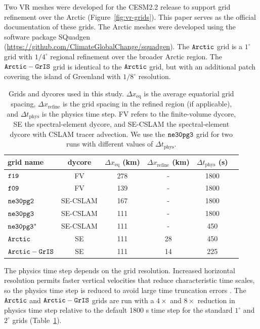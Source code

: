\documentclass[draft]{agujournal2019}
\begin{document}
Two VR meshes were developed for the CESM2.2 release to support grid refinement over the Arctic (Figure~\ref{fig:vr-grids}). This paper serves as the official documentation of these grids. The Arctic meshes were developed using the software package SQuadgen (\url{https://github.com/ClimateGlobalChange/squadgen}). The $\tt Arctic$ grid is a $1^{\circ}$ grid with $1/4^{\circ}$ regional refinement over the broader Arctic region. The $\tt Arctic-GrIS$ grid is identical to the $\tt Arctic$ grid, but with an additional patch covering the island of Greenland with $1/8^{\circ}$ resolution.

 \begin{table}
 \centering
 \scriptsize
 \begin{tabular}{lccccc}
   \hline
   grid name & dycore & $\Delta x_{\mathrm{eq}}$ (km) & $\Delta x_{\mathrm{refine}}$ (km) & $\Delta t_{\mathrm{phys}}$ (s) \\ 
   \hline
   $\tt f19$ & FV & 278 & - &1800 \\
   $\tt f09$ & FV & 139 & - &1800 \\
   $\tt ne30pg2$ & SE-CSLAM & 167 & - & 1800 \\
   $\tt ne30pg3$ & SE-CSLAM & 111 & - & 1800 \\
   $\tt ne30pg3^{*}$ & SE-CSLAM & 111 & - & 450 \\
   $\tt Arctic$ & SE & 111 & 28 & 450 \\
   $\tt Arctic-GrIS$ & SE & 111 & 14 & 225 \\
 \hline
 \end{tabular}
  \caption{Grids and dycores used in this study. $\Delta x_{\mathrm{eq}}$ is the average equatorial grid spacing, $\Delta x_{\mathrm{refine}}$ is the grid spacing in the refined region (if applicable), and $\Delta t_{\mathrm{phys}}$ is the physics time step. FV refers to the finite-volume dycore, SE the spectral-element dycore, and SE-CSLAM the spectral-element dycore with CSLAM tracer advection.  We use the $\tt ne30pg3$ grid for two runs with different values of $\Delta t_{\mathrm{phys}}$.{\color{purple}{Rene - maybe include model cost?}}}
 \label{tbl:table1}
 \end{table}

The physics time step depends on the grid resolution. Increased horizontal resolution permits faster vertical velocities that reduce characteristic time scales, so the physics time step is reduced to avoid large time truncation errors \cite{HR2018JAMES}. The $\tt Arctic$ and $\tt Arctic-GrIS$ grids are run with a $4\times$ and $8\times$ reduction in physics time step relative to the default 1800 s time step for the standard $1^{\circ}$ and $2^{\circ}$ grids (Table~\ref{tbl:table1}).
\end{document}
